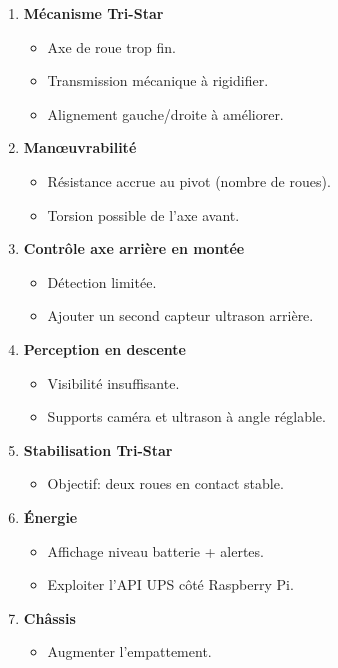 \documentclass[12pt,a4paper]{article}
\begin{document}
\begin{enumerate}
\item \textbf{Mécanisme Tri-Star}
\begin{itemize}
    \item Axe de roue trop fin.
    \item Transmission mécanique à rigidifier.
    \item Alignement gauche/droite à améliorer.
\end{itemize}

\item \textbf{Manœuvrabilité}
\begin{itemize}
    \item Résistance accrue au pivot (nombre de roues).
    \item Torsion possible de l’axe avant.
\end{itemize}

\item \textbf{Contrôle axe arrière en montée}
\begin{itemize}
    \item Détection limitée.
    \item Ajouter un second capteur ultrason arrière.
\end{itemize}

\item \textbf{Perception en descente}
\begin{itemize}
    \item Visibilité insuffisante.
    \item Supports caméra et ultrason à angle réglable.
\end{itemize}

\item \textbf{Stabilisation Tri-Star}
\begin{itemize}
    \item Objectif: deux roues en contact stable.
\end{itemize}

\item \textbf{Énergie}
\begin{itemize}
    \item Affichage niveau batterie + alertes.
    \item Exploiter l’API UPS côté Raspberry Pi.
\end{itemize}

\item \textbf{Châssis}
\begin{itemize}
    \item Augmenter l’empattement.
\end{itemize}
\end{enumerate}
\end{document}
